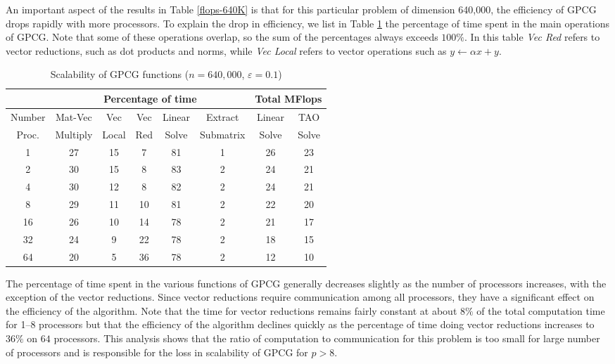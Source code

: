 \documentclass{esub2acm}
\begin{document}
An important aspect of the results in Table \ref{flops-640K} is that 
for this particular problem of dimension 640,000, the
efficiency of GPCG 
drops rapidly with more processors.
To explain the drop in efficiency, we
list in Table \ref{routines} the percentage of time spent in 
the main operations of GPCG.
Note that some of these operations overlap, so the sum
of the percentages always exceeds $ 100\% $.
In this table {\it Vec Red} refers to
vector reductions, such as dot products and norms,
while {\it Vec Local} refers to vector operations such as
$  y \leftarrow \alpha x + y $.

\begin{table}[ht]
\caption{Scalability of GPCG functions
($ n=640,000 $, $ \varepsilon = 0.1 $) }
\label{routines}
\medskip
\begin{center}
\footnotesize
\begin{tabular}{|c|ccccc|cc|}
\cline{2-8}
\multicolumn{1}{c|}{} &
\multicolumn{5}{c|}{Percentage of time}&
\multicolumn{2}{c|}{Total MFlops} \\
\hline
\multicolumn{1}{|c|}{Number}&
\multicolumn{1}{c}{Mat-Vec}&
\multicolumn{1}{c}{Vec} &
\multicolumn{1}{c}{Vec} &
\multicolumn{1}{c}{Linear}&
\multicolumn{1}{c}{Extract}&
\multicolumn{1}{|c}{Linear}&
\multicolumn{1}{c|}{TAO} \\

\multicolumn{1}{|c|}{Proc.}&
\multicolumn{1}{c}{Multiply}&
\multicolumn{1}{c}{Local} &
\multicolumn{1}{c}{Red} &
\multicolumn{1}{c}{Solve}&
\multicolumn{1}{c}{Submatrix}&
\multicolumn{1}{|c}{Solve}&
\multicolumn{1}{c|}{Solve} \\

\hline
1 & 27 & 15 & 7 & 81 & 1 &26 & 23 \\ 
2 & 30 & 15 & 8 & 83 & 2 &24 & 21 \\ 
4 & 30 & 12 & 8 & 82 & 2 &24 & 21 \\ 
8 & 29 & 11 & 10 & 81 & 2 &22 & 20 \\ 
16 & 26 & 10 & 14 & 78 & 2 &21 & 17 \\ 
32 & 24 & 9 & 22 & 78 & 2 &18 & 15 \\ 
64 & 20 & 5 & 36 & 78 & 2 &12 & 10 \\ 
\hline
\end{tabular}
\end{center}
\end{table}

The percentage of time spent in the various functions
of GPCG generally decreases slightly as the number of processors increases,
with the exception of the vector reductions.
Since vector reductions require
communication among all processors, they have a significant effect
on the efficiency of the algorithm.
Note that the time for vector reductions
remains fairly constant at about $8\%$ of the total computation
time for \mbox{1--8} processors but that the
efficiency of the algorithm declines
quickly as the percentage of time doing vector reductions
increases to $36\%$ on $64$ processors.
This analysis shows that 
the ratio of computation to communication for this problem is too small
for large number of processors and is responsible for
the loss in scalability of GPCG for $ p > 8 $.
\end{document}
